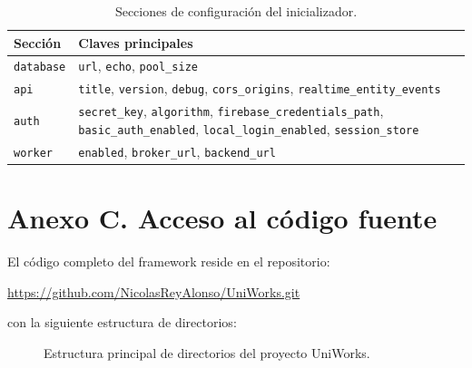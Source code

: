 \begin{table}[H]
\caption{Secciones de configuración del inicializador.}
\label{tab:configref}
\centering
\begin{tabular}{|l|p{8cm}|}
\hline
\textbf{Sección} & \textbf{Claves principales} \\ \hline
\texttt{database} & \texttt{url}, \texttt{echo}, \texttt{pool\_size} \\ \hline
\texttt{api} & \texttt{title}, \texttt{version}, \texttt{debug},
\texttt{cors\_origins}, \texttt{realtime\_entity\_events} \\ \hline
\texttt{auth} & \texttt{secret\_key}, \texttt{algorithm},
\texttt{firebase\_credentials\_path}, \texttt{basic\_auth\_enabled},
\texttt{local\_login\_enabled}, \texttt{session\_store} \\ \hline
\texttt{worker} & \texttt{enabled}, \texttt{broker\_url},
\texttt{backend\_url} \\ \hline
\end{tabular}
\end{table}

\section{Anexo C. Acceso al código fuente}
El código completo del framework reside en el repositorio: 
\begin{center}
  \href{https://github.com/NicolasReyAlonso/UniWorks.git}{https://github.com/NicolasReyAlonso/UniWorks.git}
\end{center}
con la siguiente estructura de directorios:

\begin{figure}[!htbp]
\centering
{}
\caption{Estructura principal de directorios del proyecto UniWorks.}
\label{fig:estructura-directorios}
\end{figure}

